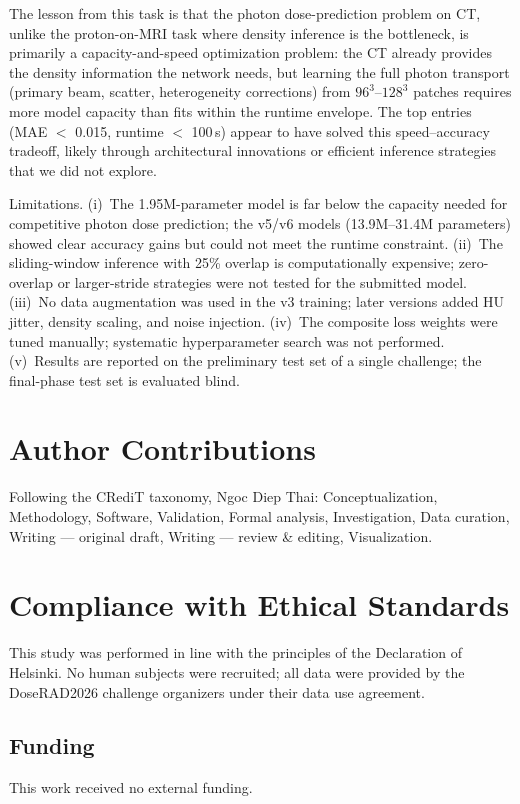 \documentclass[runningheads]{llncs}
\begin{document}
The lesson from this task is that the photon dose-prediction problem on CT, unlike the proton-on-MRI task where density inference is the bottleneck, is primarily a capacity-and-speed optimization problem: the CT already provides the density information the network needs, but learning the full photon transport (primary beam, scatter, heterogeneity corrections) from $96^3$--$128^3$ patches requires more model capacity than fits within the runtime envelope. The top entries (MAE $<$ 0.015, runtime $<$ 100\,s) appear to have solved this speed--accuracy tradeoff, likely through architectural innovations or efficient inference strategies that we did not explore.

Limitations. (i)~The 1.95M-parameter model is far below the capacity needed for competitive photon dose prediction; the v5/v6 models (13.9M--31.4M parameters) showed clear accuracy gains but could not meet the runtime constraint. (ii)~The sliding-window inference with 25\% overlap is computationally expensive; zero-overlap or larger-stride strategies were not tested for the submitted model. (iii)~No data augmentation was used in the v3 training; later versions added HU jitter, density scaling, and noise injection. (iv)~The composite loss weights were tuned manually; systematic hyperparameter search was not performed. (v)~Results are reported on the preliminary test set of a single challenge; the final-phase test set is evaluated blind.

\section{Author Contributions}
Following the CRediT taxonomy, Ngoc Diep Thai: Conceptualization, Methodology, Software, Validation, Formal analysis, Investigation, Data curation, Writing --- original draft, Writing --- review \& editing, Visualization.

\section{Compliance with Ethical Standards}
This study was performed in line with the principles of the Declaration of Helsinki. No human subjects were recruited; all data were provided by the DoseRAD2026 challenge organizers under their data use agreement.

\subsection*{Funding}
This work received no external funding.
\end{document}
